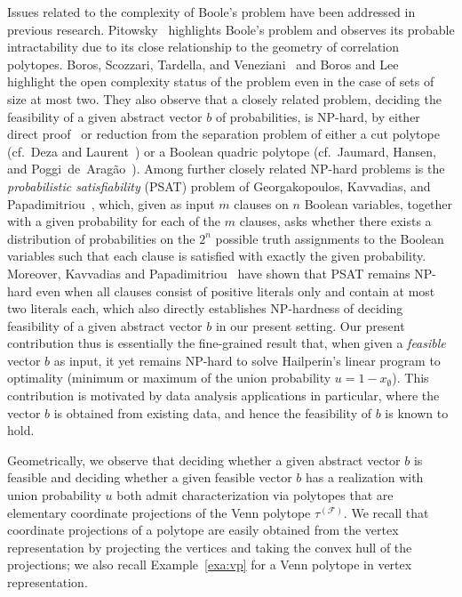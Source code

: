 \documentclass[11pt]{article}
\newcommand{\vp}{\ensuremath{\tau}}
\begin{document}
Issues related to the complexity of Boole's problem have been 
addressed in previous research.
Pitowsky~\cite{Pitowsky1991} highlights Boole's problem and observes
its probable intractability due to its close relationship to the geometry 
of correlation polytopes.
Boros, Scozzari, Tardella, and Veneziani~\cite{BorosSTV2014}
and Boros and Lee~\cite{BorosL2026} highlight the open complexity
status of the problem even in the case of sets of size at most two.
They also observe that a closely related problem,
deciding the feasibility of a given abstract vector $b$ of
probabilities, is NP-hard, by either direct proof~\cite{Pitowsky1991} or 
reduction from the separation problem of either
a cut polytope (cf.~Deza and Laurent~\cite{DezaL1997}) or
a Boolean quadric polytope
(cf.~Jaumard, Hansen, and Poggi~de~Arag\~ao~\cite{JaumardHP1991}).
Among further closely
related NP-hard problems is the {\em probabilistic satisfiability} (PSAT)
problem of
Georgakopoulos, Kavvadias, and Papadimitriou~\cite{GeorgakopoulosKP1998},
which, given
as input $m$ clauses on $n$ Boolean variables, together with a given probability
for each of the $m$ clauses, asks whether there exists a distribution
of probabilities on the $2^n$ possible truth assignments to
the Boolean variables such that each clause is satisfied with exactly
the given probability. Moreover, Kavvadias and
Papadimitriou~\cite{KavvadiasP1990} have shown
that PSAT remains NP-hard even when all clauses consist of positive literals
only and contain at most two literals each, which also directly
establishes NP-hardness of deciding feasibility of a given abstract
vector $b$ in our present setting. Our present contribution thus is
essentially the fine-grained result that, when given a {\em feasible}
vector $b$ as input, it yet remains NP-hard to solve Hailperin's linear program
to optimality (minimum or maximum of the union probability $u=1-x_{\emptyset}$).
This contribution is motivated by data analysis applications in 
particular, where the vector $b$ is obtained from existing data, and 
hence the feasibility of $b$ is known to hold.

Geometrically, we observe that deciding whether a given abstract vector 
$b$ is feasible and deciding whether a given feasible 
vector $b$ has a realization with union probability $u$ 
both admit characterization via polytopes that are 
elementary coordinate projections of the Venn polytope $\vp^{(\mathcal{F})}$. 
We recall that coordinate projections of a polytope are easily obtained 
from the vertex representation by projecting the vertices and taking
the convex hull of the projections; we also recall Example~\ref{exa:vp}
for a Venn polytope in vertex representation.
\end{document}
